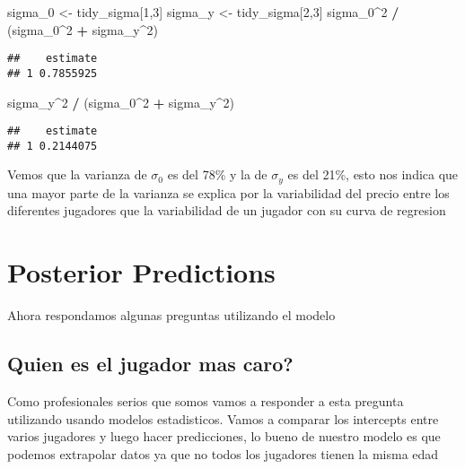 \documentclass[
]{article}
\newenvironment{Shaded}{\begin{snugshade}}{\end{snugshade}}
\newcommand{\DecValTok}[1]{\textcolor[rgb]{0.00,0.00,0.81}{#1}}
\newcommand{\NormalTok}[1]{#1}
\newcommand{\OtherTok}[1]{\textcolor[rgb]{0.56,0.35,0.01}{#1}}
\newcommand{\SpecialCharTok}[1]{\textcolor[rgb]{0.81,0.36,0.00}{\textbf{#1}}}
\begin{document}
\begin{Shaded}
\begin{Highlighting}[]
\NormalTok{sigma\_0 }\OtherTok{\textless{}{-}}\NormalTok{ tidy\_sigma[}\DecValTok{1}\NormalTok{,}\DecValTok{3}\NormalTok{]}
\NormalTok{sigma\_y }\OtherTok{\textless{}{-}}\NormalTok{ tidy\_sigma[}\DecValTok{2}\NormalTok{,}\DecValTok{3}\NormalTok{]}
\NormalTok{sigma\_0}\SpecialCharTok{\^{}}\DecValTok{2} \SpecialCharTok{/}\NormalTok{ (sigma\_0}\SpecialCharTok{\^{}}\DecValTok{2} \SpecialCharTok{+}\NormalTok{ sigma\_y}\SpecialCharTok{\^{}}\DecValTok{2}\NormalTok{)}
\end{Highlighting}
\end{Shaded}

\begin{verbatim}
##    estimate
## 1 0.7855925
\end{verbatim}

\begin{Shaded}
\begin{Highlighting}[]
\NormalTok{sigma\_y}\SpecialCharTok{\^{}}\DecValTok{2} \SpecialCharTok{/}\NormalTok{ (sigma\_0}\SpecialCharTok{\^{}}\DecValTok{2} \SpecialCharTok{+}\NormalTok{ sigma\_y}\SpecialCharTok{\^{}}\DecValTok{2}\NormalTok{)}
\end{Highlighting}
\end{Shaded}

\begin{verbatim}
##    estimate
## 1 0.2144075
\end{verbatim}

Vemos que la varianza de \(\sigma_{0}\) es del 78\% y la de
\(\sigma_{y}\) es del 21\%, esto nos indica que una mayor parte de la
varianza se explica por la variabilidad del precio entre los diferentes
jugadores que la variabilidad de un jugador con su curva de regresion

\section{Posterior Predictions}\label{posterior-predictions}

Ahora respondamos algunas preguntas utilizando el modelo

\subsection{Quien es el jugador mas
caro?}\label{quien-es-el-jugador-mas-caro}

Como profesionales serios que somos vamos a responder a esta pregunta
utilizando usando modelos estadisticos. Vamos a comparar los intercepts
entre varios jugadores y luego hacer predicciones, lo bueno de nuestro
modelo es que podemos extrapolar datos ya que no todos los jugadores
tienen la misma edad
\end{document}
